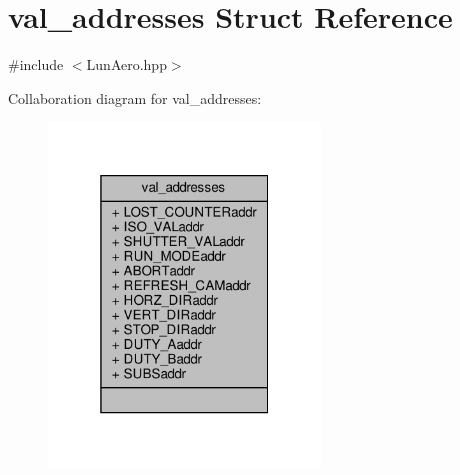 \hypertarget{structval__addresses}{}\section{val\+\_\+addresses Struct Reference}
\label{structval__addresses}


{\ttfamily \#include $<$Lun\+Aero.\+hpp$>$}



Collaboration diagram for val\+\_\+addresses\+:
\nopagebreak
\begin{figure}[H]
\begin{center}
\leavevmode
\includegraphics[width=205pt]{structval__addresses__coll__graph}
\end{center}
\end{figure}
